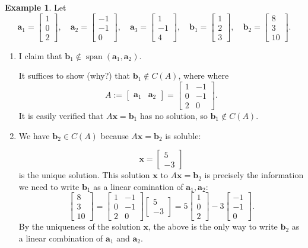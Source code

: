 \documentclass[12pt]{amsart}
\DeclareMathOperator{\Span}{span}
\theoremstyle{definition} \newtheorem{definition}[theorem]{Definition}
\newtheorem{example}[theorem]{Example}
\newcommand{\ba}{\mathbf{a}}
\newcommand{\bb}{\mathbf{b}}
\newcommand{\bx}{\mathbf{x}}
\newcommand{\mat}[1]{\begin{bmatrix}#1\end{bmatrix}}
\newcommand{\spn}[1]{\Span\left(#1\right)}
\begin{document}
\begin{example}
  Let
  \[
    \ba_1 = \mat{1\\0\\2},\quad 
    \ba_2=\mat{-1\\-1\\0},\quad 
    \ba_3=\mat{1\\-1\\4},\quad
    \bb_1=\mat{1\\2\\3},\quad
    \bb_2=\mat{8\\3\\10}.
  \]
  \begin{enumerate}
    \item I claim that $\bb_1\notin \spn{\ba_1,\ba_2}$.

  \medskip
  It suffices to show (why?) that $\bb_1\notin C(A)$, where
  where
  \[
    A:=\mat{\ba_1&\ba_2}=\mat{1&-1\\0&-1\\2&0}.
  \]
  It is easily verified that $A\bx=\bb_1$ has no solution, so $\bb_1\notin C(A)$.


\item
  We have $\bb_2\in C(A)$ because $A\bx=\bb_2$ is soluble:

  \[
    \bx=\mat{5\\-3}
  \]
  is the unique solution.
  This solution $\bx$ to $A\bx=\bb_2$ is precisely the information we need to write $\bb_1$ as a linear comination of $\ba_1,\ba_2$:
  \[
  \mat{8\\3\\10} = \mat{1&-1\\0&-1\\2&0}\mat{5\\-3} =
  5\mat{1\\0\\2} - 3\mat{-1\\-1\\0}.
\]
By the uniqueness of the solution $\bx$, the above is the only way to write $\bb_2$ as a linear combination of $\ba_1$ and $\ba_2$.
\end{enumerate}
\end{example}
\end{document}
